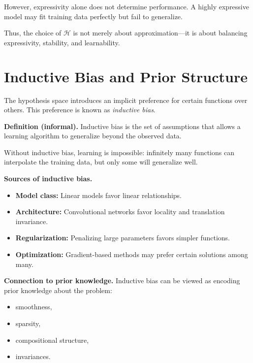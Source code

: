 \medskip

\noindent
However, expressivity alone does not determine performance. A highly expressive model may fit training data perfectly but fail to generalize.

\medskip

Thus, the choice of $\mathcal{H}$ is not merely about approximation—it is about balancing expressivity, stability, and learnability.

\section{Inductive Bias and Prior Structure}

The hypothesis space introduces an implicit preference for certain functions over others. This preference is known as \emph{inductive bias}.

\medskip

\noindent
\textbf{Definition (informal).}  
Inductive bias is the set of assumptions that allows a learning algorithm to generalize beyond the observed data.

\medskip

\noindent
Without inductive bias, learning is impossible: infinitely many functions can interpolate the training data, but only some will generalize well.

\medskip

\noindent
\textbf{Sources of inductive bias.}

\begin{itemize}
    \item \textbf{Model class:}  
    Linear models favor linear relationships.

    \item \textbf{Architecture:}  
    Convolutional networks favor locality and translation invariance.

    \item \textbf{Regularization:}  
    Penalizing large parameters favors simpler functions.

    \item \textbf{Optimization:}  
    Gradient-based methods may prefer certain solutions among many.
\end{itemize}

\medskip

\noindent
\textbf{Connection to prior knowledge.}  
Inductive bias can be viewed as encoding prior knowledge about the problem:
\begin{itemize}
    \item smoothness,
    \item sparsity,
    \item compositional structure,
    \item invariances.
\end{itemize}

